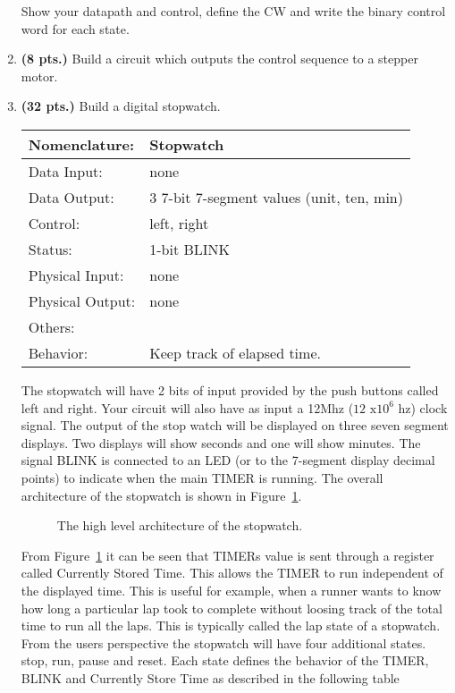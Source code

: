 \begin{enumerate}
Show your datapath and control, define the CW and write the binary control
word for each state.

\item\textbf{ (8 pts.)} Build a circuit which outputs the control sequence
to a stepper motor.

\item\textbf{ (32 pts.)} Build a digital stopwatch.

\begin{tabular}{|l|p{3.5in}|} \hline
Nomenclature:  & Stopwatch         \\ \hline
Data Input:    & none         \\ \hline
Data Output:   & 3 7-bit 7-segment values (unit, ten, min)   \\ \hline
Control:       & left, right           \\ \hline
Status:        & 1-bit BLINK                         \\ \hline
Physical Input:& none        \\ \hline
Physical Output:& none          \\ \hline
Others:        &            \\ \hline
Behavior:      & Keep track of elapsed time. \\ \hline
\end{tabular}

The stopwatch will have 2 bits of input provided by the
push buttons called left and right.  Your circuit will also have as 
input a 12Mhz ($12\text{ x}10^6$ hz) clock signal.   The output of the stop 
watch will be displayed on three seven segment displays.  Two 
displays will show seconds and one will show minutes.   The signal
BLINK is connected to an LED (or to the 7-segment display decimal points)
to indicate when the main TIMER is running.  The overall
architecture of the stopwatch is shown in Figure~\ref{fig:stopwatch_dp}.

\begin{figure}[ht]
\caption{The high level architecture of the stopwatch.}
\label{fig:stopwatch_dp}
\end{figure}

From Figure~\ref{fig:stopwatch_dp} it can be seen that TIMERs
value is sent through a register called Currently Stored Time.
This allows the TIMER to run independent of the displayed time.
This is useful for example, when a runner wants to know how long 
a particular lap took to complete without loosing track of the 
total time to run all the laps.
This is typically called the lap state of a stopwatch.  From the 
users perspective the stopwatch will have four additional
states.  stop, run,  pause and reset.  Each state defines the
behavior of the TIMER, BLINK and Currently Store Time as described
in the following table


\end{enumerate}

